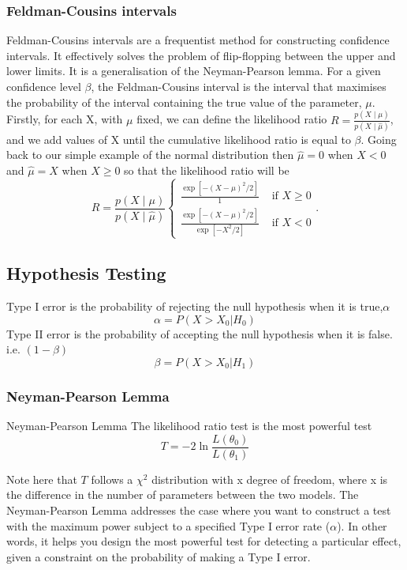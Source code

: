 \documentclass[12pt,a4paper]{article}
\begin{document}
\subsubsection{Feldman-Cousins intervals}
Feldman-Cousins intervals are a frequentist method for constructing confidence intervals. It effectively solves the problem of flip-flopping between the upper and lower limits. It is a generalisation of the Neyman-Pearson lemma.
For a given confidence level $\beta$, the Feldman-Cousins interval is the interval that maximises the probability of the interval containing the true value of the parameter, $\mu$.
Firstly, for each X, with $\mu$ fixed, we can define the likelihood ratio
$R=\frac{p(X \mid \mu)}{p(X \mid \hat{\mu})}$,
and we add values of X until the cumulative likelihood ratio is equal to $\beta$.
Going back to our simple example of the normal distribution then $\hat{\mu}=0$ when $X<0$ and $\hat{\mu}=X$ when $X \geq 0$ so that the likelihood ratio will be
\begin{equation*}
R=\frac{p(X \mid \mu)}{p(X \mid \hat{\mu})}\left\{\begin{array}{ll}
\frac{\exp \left[-(X-\mu)^2 / 2\right]}{1} & \text { if } X \geq 0 \\
\frac{\exp \left[-(X-\mu)^2 / 2\right]}{\exp \left[-X^2 / 2\right]} & \text { if } X<0
\end{array} .\right.
\end{equation*}
\subsection{Hypothesis Testing}
Type I error is the probability of rejecting the null hypothesis when it is true,$\alpha$\\
$$
\alpha = P( X > X_0| H_0)
$$
Type II error is the probability of accepting the null hypothesis when it is false. i.e. $(1-\beta)$\\
$$
\beta = P (X > X_0| H_1)
$$

\subsubsection{Neyman-Pearson Lemma}
\begin{theorem}
    {Neyman-Pearson Lemma}
    {The likelihood ratio test is the most powerful test
    $$
    T = -2 \ln \frac{L(\theta_0)}{L(\theta_1)}
    $$}
\end{theorem}
Note here that $T$ follows a $\chi^2$ distribution with x degree of freedom, where x is the difference in the number of parameters between the two models.
The Neyman-Pearson Lemma addresses the case where you want to construct a test with the maximum power subject to a specified Type I error rate ($\alpha$). In other words, it helps you design the most powerful test for detecting a particular effect, given a constraint on the probability of making a Type I error.
\end{document}
